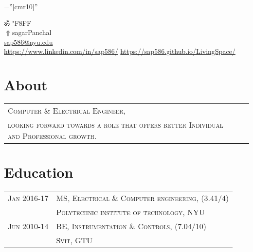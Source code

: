 \documentclass[a4paper]{article}
\newcommand{\apple}{\char"F8FF}
\begin{document}
\pagestyle{empty} 						%
\font\fb=''[cmr10]'' 						%

\par	{\centering
	ॐ
	{\setmainfont{Apple Chancery} \apple}																														\\
	\href{https://sap586.github.io/LivingSpace/}{$ \Uparrow$}{sagarPanchal}																										\\
	\small \href{mailto:sap586@nyu.edu}{sap586@nyu.edu}																						\\
	\small \href{https://www.linkedin.com/in/sap586/}{https://www.linkedin.com/in/sap586/}		\textbullet \href{https://sap586.github.io/LivingSpace/}{https://sap586.github.io/LivingSpace/}		\par}
	
\section	{	About		}
	\begin{tabular}{ll}
		\textsc{	Computer \& Electrical Engineer,					}\\
		\textsc{	looking forward towards a role that offers better Individual and Professional growth.	}
	\\\end{tabular}



\section	{	Education		}
	\begin{tabular}{rl}
		\small{}\textsc{		Jan 2016-17	} 		& 		\textsc{	MS, Electrical \& Computer engineering, 		\small {(3.41/4)}			}	\\
 											& 		\textsc{	Polytechnic institute of technology, NYU							}	\\
 		\small{}\textsc{		Jun 2010-14	} 		& 		\textsc{	BE, Instrumentation \small{\&} Controls,		\small {(7.04/10)}		}	\\
 											& 		\textsc{	Svit, GTU													}	\\
	\end{tabular}

\end{document}
